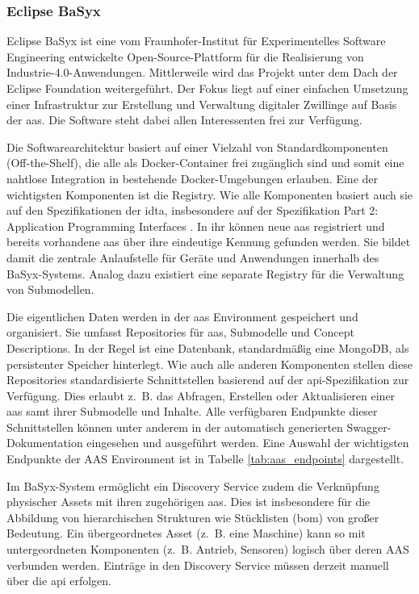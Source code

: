 \subsubsection{Eclipse BaSyx }
Eclipse BaSyx ist eine vom Fraunhofer-Institut für Experimentelles Software Engineering entwickelte Open-Source-Plattform für die Realisierung von Industrie-4.0-Anwendungen.
Mittlerweile wird das Projekt unter dem Dach der Eclipse Foundation weitergeführt.
Der Fokus liegt auf einer einfachen Umsetzung einer Infrastruktur zur Erstellung und Verwaltung digitaler Zwillinge auf Basis der \acs{aas}.
Die Software steht dabei allen Interessenten frei zur Verfügung.

Die Softwarearchitektur basiert auf einer Vielzahl von Standardkomponenten (Off-the-Shelf), die alle als Docker-Container frei zugänglich sind und somit eine nahtlose Integration in bestehende Docker-Umgebungen erlauben.
Eine der wichtigsten Komponenten ist die Registry. 
Wie alle Komponenten basiert auch sie auf den Spezifikationen der \acs{idta}, insbesondere auf der Spezifikation Part 2: Application Programming Interfaces \cite{SpezifikationPart2}.
In ihr können neue \acs{aas} registriert und bereits vorhandene \acs{aas} über ihre eindeutige Kennung gefunden werden.
Sie bildet damit die zentrale Anlaufstelle für Geräte und Anwendungen innerhalb des BaSyx-Systems.
Analog dazu existiert eine separate Registry für die Verwaltung von Submodellen.

\newpage
Die eigentlichen Daten werden in der \acs{aas} Environment gespeichert und organisiert.
Sie umfasst Repositories für \acs{aas}, Submodelle und Concept Descriptions.
In der Regel ist eine Datenbank, standardmäßig eine MongoDB, als persistenter Speicher hinterlegt.
Wie auch alle anderen Komponenten stellen diese Repositories standardisierte Schnittstellen basierend auf der \ac{api}-Spezifikation zur Verfügung.
Dies erlaubt z.~B. das Abfragen, Erstellen oder Aktualisieren einer \acs{aas} samt ihrer Submodelle und Inhalte.
Alle verfügbaren Endpunkte dieser Schnittstellen können unter anderem in der automatisch generierten Swagger-Dokumentation eingesehen und ausgeführt werden. 
Eine Auswahl der wichtigsten Endpunkte der AAS Environment ist in Tabelle \ref{tab:aas_endpoints} dargestellt.


\vspace{-0.75em}

Im BaSyx-System ermöglicht ein Discovery Service zudem die Verknüpfung physischer Assets mit ihren zugehörigen \acs{aas}.
Dies ist insbesondere für die Abbildung von hierarchischen Strukturen wie Stücklisten (\ac{bom}) von großer Bedeutung.
Ein übergeordnetes Asset (z.~B. eine Maschine) kann so mit untergeordneten Komponenten (z.~B. Antrieb, Sensoren) logisch über deren AAS verbunden werden.
Einträge in den Discovery Service müssen derzeit manuell über die \acs{api} erfolgen.

